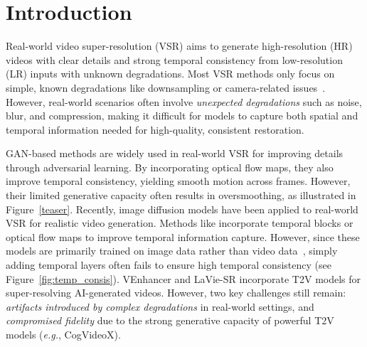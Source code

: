 \section{Introduction}
\label{sec:intro}
Real-world video super-resolution (VSR) aims to generate high-resolution (HR) videos with clear details and strong temporal consistency from low-resolution (LR) inputs with unknown degradations. 
Most VSR methods \cite{wang2019edvr, chan2022basicvsr++, jo2018deep, xue2019video} only focus on simple, known degradations like downsampling \cite{fuoli2019efficient, isobe2020video} or camera-related issues~\cite{yang2021realvsr}. 
However, real-world scenarios often involve \textit{unexpected degradations} such as noise, blur, and compression, making it difficult for models to capture both spatial and temporal information needed for high-quality, consistent restoration.

GAN-based methods \cite{zhang2024realviformer, chan2022investigating, wang2021realesrgan, wu2022animesr, yang2021realvsr} are widely used in real-world VSR for improving details through adversarial learning. 
By incorporating optical flow maps, they also improve temporal consistency, yielding smooth motion across frames. However, their limited generative capacity often results in oversmoothing, as illustrated in Figure~\ref{teaser}.
%
Recently, image diffusion models \cite{rombach2022high} have been applied to real-world VSR for realistic video generation. Methods like \cite{zhou2024upscale, chen2024learning, yuan2024inflation, yang2023mgldvsr} incorporate temporal blocks or optical flow maps to improve temporal information capture. However, since these models are primarily trained on image data rather than video data~\cite{nan2024openvid, chen2024panda, wang2023internvid, wang2024vidprom}, simply adding temporal layers often fails to ensure high temporal consistency (see Figure~\ref{fig:temp_consis}). 
%
VEnhancer \cite{he2024venhancer} and LaVie-SR \cite{wang2023lavie} incorporate T2V models for super-resolving AI-generated videos. However, two key challenges still remain: \textit{artifacts introduced by complex degradations} in real-world settings, and \textit{compromised fidelity} due to the strong generative capacity of powerful T2V models (\textit{e.g.}, CogVideoX).

